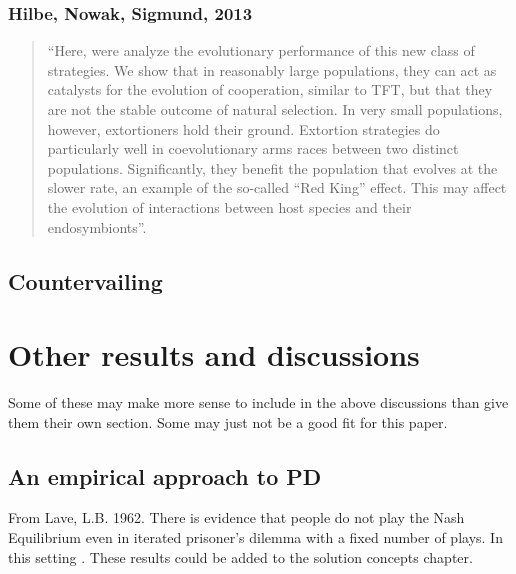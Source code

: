 \subsection{Hilbe, Nowak, Sigmund, 2013}
\begin{quote}``Here, were analyze the evolutionary performance of this new class of strategies. We show that in reasonably large populations, they can act as catalysts for the evolution of cooperation, similar to TFT, but that they are not the stable outcome of natural selection. In very small populations, however, extortioners hold their ground. Extortion strategies do particularly well in coevolutionary arms races between two distinct populations. Significantly, they benefit the population that evolves at the slower rate, an example of the so-called ``Red King'' effect. This may affect the evolution of interactions between host species and their endosymbionts''.
\end{quote}

\section{Countervailing}

\chapter{Other results and discussions}
Some of these may make more sense to include in the above discussions than give them their own section. Some may just not be a good fit for this paper.
\section{An empirical approach to PD}
From Lave, L.B. 1962. There is evidence that people do not play the Nash Equilibrium even in iterated prisoner's dilemma with a fixed number of plays. In this setting . These results could be added to the solution concepts chapter.

